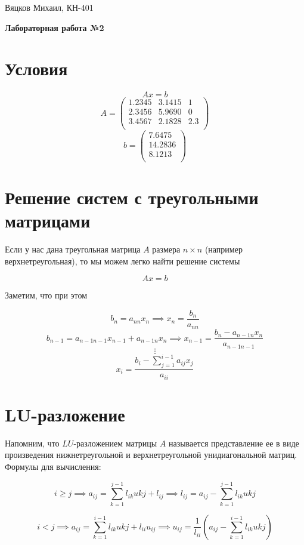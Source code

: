 \documentclass[11pt,a4paper,oneside]{article}
\begin{document}
\begin{center}
	{Вяцков Михаил, КН-401}
	
	{\huge \bf Лабораторная работа №2}
\end{center}

\section{Условия}

$$ Ax = b $$
$$ A = \left(\begin{matrix}
	1.2345 & 3.1415 & 1 \\
	2.3456 & 5.9690 & 0 \\
	3.4567 & 2.1828 & 2.3 \\
\end{matrix}\right) $$
$$ b = \left(\begin{matrix}
	7.6475 \\
	14.2836 \\
	8.1213 \\
\end{matrix}\right) $$

\section{Решение систем с треугольными матрицами}

Если у нас дана треугольная матрица $A$ размера $n \times n$ (например верхнетреугольная), то мы можем легко найти решение системы

$$ Ax = b $$

Заметим, что при этом

$$ b_n = a_{nn} x_n \implies x_n = \frac{b_n}{a_{nn}} $$
$$ b_{n - 1} = a_{n-1 n-1} x_{n - 1} + a_{n-1 n} x_{n} \implies x_{n - 1}
	= \frac{b_n - a_{n-1 n} x_n}{a_{n-1 n-1}} $$
$$ \vdots $$
$$ x_i = \frac{b_i - \sum_{j = 1}^{i - 1} a_{ij} x_j}{a_{ii}} $$

\section{LU-разложение}

Напомним, что $LU$-разложением матрицы $A$ называется представление ее в виде произведения нижнетреугольной и верхнетреугольной унидиагональной матриц. Формулы для вычисления:

$$ i \ge j \implies a_{ij} = \sum_{k = 1}^{j - 1} l_{ik} u{kj} + l_{ij}
	\implies l_{ij} = a_{ij} - \sum_{k = 1}^{j - 1} l_{ik} u{kj} $$
	
$$ i < j \implies a_{ij} = \sum_{k = 1}^{i - 1} l_{ik} u{kj} + l_{ii} u_{ij}
	\implies u_{ij} = \frac{1}{l_{ii}} \left( a_{ij} - \sum_{k = 1}^{i - 1} l_{ik} u{kj} \right) $$
	
\end{document}
